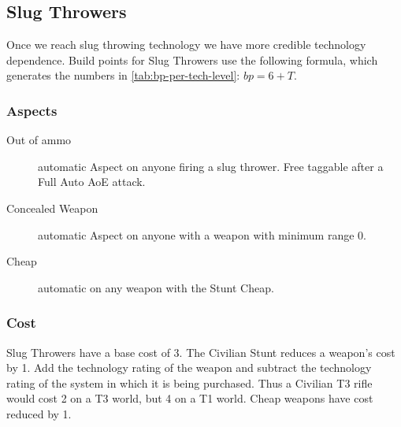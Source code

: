 \iflandscape{\vfil}{}
\subsection{Slug Throwers}
\label{sec:slug-throwers}

Once we reach slug throwing technology we have more credible
technology dependence. Build points for Slug Throwers use the following formula, which generates the numbers in \autoref{tab:bp-per-tech-level}: $bp = 6 + T$.


% 


\subsubsection{Aspects}
\begin{description}
\item[Out of ammo]
automatic Aspect on anyone firing a slug thrower. Free
taggable after a Full Auto AoE attack.
\item[Concealed Weapon]
automatic Aspect on anyone with a weapon with minimum range 0.
\item[Cheap]
automatic on any weapon with the Stunt Cheap.
\end{description}

\subsubsection{Cost}

Slug Throwers have a base cost of 3. The Civilian Stunt reduces a
weapon's cost by 1. Add the technology rating of the weapon and
subtract the technology rating of the system in which it is being
purchased. Thus a Civilian T3 rifle would cost 2 on a T3 world, but 4
on a T1 world. Cheap weapons have cost reduced by 1.


